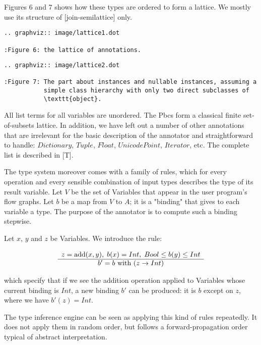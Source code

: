 \documentclass{acm_proc_article-sp}
\begin{document}
Figures 6 and 7 shows how these types are ordered to form a lattice.  We
mostly use its structure of [join-semilattice] only.

\begin{verbatim}
.. graphviz:: image/lattice1.dot

:Figure 6: the lattice of annotations.
\end{verbatim}

\begin{verbatim}
.. graphviz:: image/lattice2.dot

:Figure 7: The part about instances and nullable instances, assuming a
           simple class hierarchy with only two direct subclasses of
           \texttt{object}.
\end{verbatim}


All list terms for all variables are unordered.  The Pbcs form a
classical finite set-of-subsets lattice.  In addition, we have left
out a number of other annotations that are irrelevant for the basic
description of the annotator and straightforward to handle:
$Dictionary$, $Tuple$, $Float$, $UnicodePoint$, $Iterator$, etc.  The
complete list is described in [T].

The type system moreover comes with a family of rules, which for every
operation and every sensible combination of input types describes the
type of its result variable.  Let $V$ be the set of Variables that
appear in the user program's flow graphs.  Let $b$ be a map from $V$
to $A$; it is a "binding" that gives to each variable a type.  The
purpose of the annotator is to compute such a binding stepwise.

Let $x$, $y$ and $z$ be Variables.  We introduce the rule:

$$
\begin{array}{c}
 z = \mathrm{add}(x, y), \; b(x) =
    Int, \; Bool \leq b(y) \leq Int \\ \hline
 b' = b \hbox{\ with\ } (z
    \rightarrow Int) 
\end{array}
$$

which specify that if we see the addition operation applied to
Variables whose current binding is $Int$, a new binding $b'$ can be
produced: it is $b$ except on $z$, where we have $b'(z) = Int$.

The type inference engine can be seen as applying this kind of rules
repeatedly.  It does not apply them in random order, but follows a
forward-propagation order typical of abstract interpretation.
\end{document}
